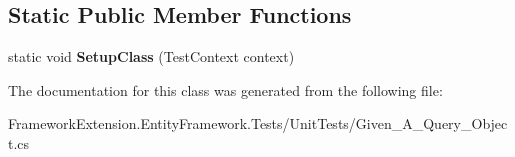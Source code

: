 \subsection*{Static Public Member Functions}
\begin{DoxyCompactItemize}
\item 
\hypertarget{class_framework_extension_1_1_entity_framework_1_1_tests_1_1_unit_tests_1_1_given___a___query___object_ac56086e9c84a2d46794d66dc33c7d10c}{static void {\bfseries Setup\-Class} (Test\-Context context)}\label{class_framework_extension_1_1_entity_framework_1_1_tests_1_1_unit_tests_1_1_given___a___query___object_ac56086e9c84a2d46794d66dc33c7d10c}

\end{DoxyCompactItemize}


The documentation for this class was generated from the following file\-:\begin{DoxyCompactItemize}
\item 
Framework\-Extension.\-Entity\-Framework.\-Tests/\-Unit\-Tests/Given\-\_\-\-A\-\_\-\-Query\-\_\-\-Object.\-cs\end{DoxyCompactItemize}
